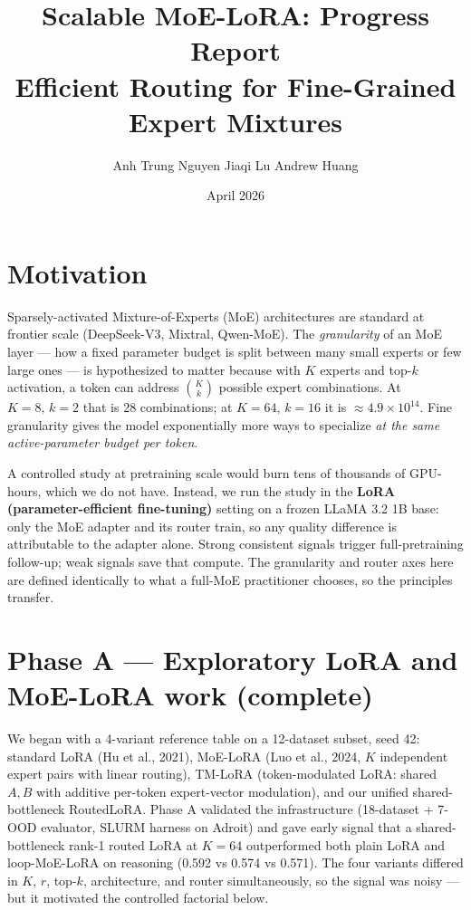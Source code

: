 \documentclass[10pt]{article}
\title{\vspace{-1.5em}\textbf{Scalable MoE-LoRA: Progress Report}\\[-0.2em]
\large Efficient Routing for Fine-Grained Expert Mixtures}
\author{\small Anh Trung Nguyen \quad Jiaqi Lu \quad Andrew Huang}
\date{\small April 2026}
\begin{document}
\maketitle
\vspace{-2em}

\section*{Motivation}
Sparsely-activated Mixture-of-Experts (MoE) architectures are standard at frontier scale (DeepSeek-V3, Mixtral, Qwen-MoE). The \emph{granularity} of an MoE layer --- how a fixed parameter budget is split between many small experts or few large ones --- is hypothesized to matter because with $K$ experts and top-$k$ activation, a token can address $\binom{K}{k}$ possible expert combinations. At $K{=}8,\, k{=}2$ that is 28 combinations; at $K{=}64,\, k{=}16$ it is $\approx 4.9\times 10^{14}$. Fine granularity gives the model exponentially more ways to specialize \emph{at the same active-parameter budget per token}.

A controlled study at pretraining scale would burn tens of thousands of GPU-hours, which we do not have. Instead, we run the study in the \textbf{LoRA (parameter-efficient fine-tuning)} setting on a frozen LLaMA 3.2 1B base: only the MoE adapter and its router train, so any quality difference is attributable to the adapter alone. Strong consistent signals trigger full-pretraining follow-up; weak signals save that compute. The granularity and router axes here are defined identically to what a full-MoE practitioner chooses, so the principles transfer.

\section*{Phase A --- Exploratory LoRA and MoE-LoRA work (complete)}

We began with a 4-variant reference table on a 12-dataset subset, seed 42: standard LoRA (Hu et al., 2021), MoE-LoRA (Luo et al., 2024, $K$ independent expert pairs with linear routing), TM-LoRA (token-modulated LoRA: shared $A,B$ with additive per-token expert-vector modulation), and our unified shared-bottleneck RoutedLoRA. Phase A validated the infrastructure (18-dataset + 7-OOD evaluator, SLURM harness on Adroit) and gave early signal that a shared-bottleneck rank-1 routed LoRA at $K{=}64$ outperformed both plain LoRA and loop-MoE-LoRA on reasoning (0.592 vs 0.574 vs 0.571). The four variants differed in $K$, $r$, top-$k$, architecture, and router simultaneously, so the signal was noisy --- but it motivated the controlled factorial below.
\end{document}
